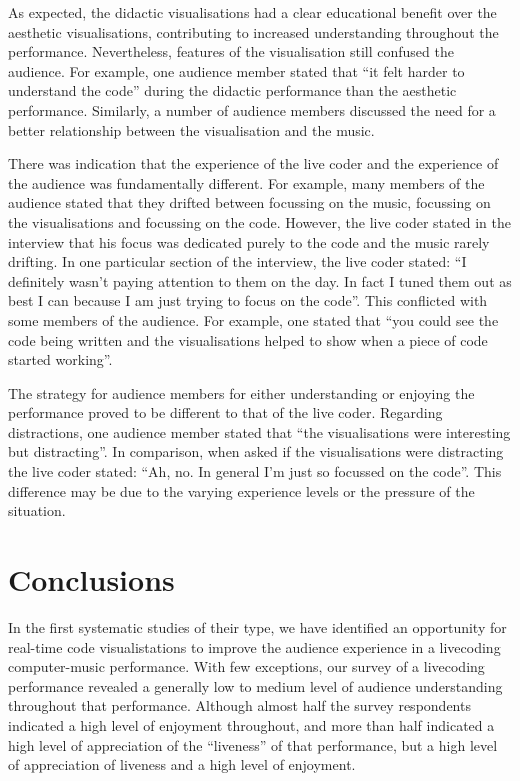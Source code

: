 \documentclass{sig-alternate}
\begin{document}
As expected, the didactic visualisations had a clear educational benefit over the aesthetic visualisations, contributing to increased understanding throughout the performance. Nevertheless, features of the visualisation still confused the audience. For example, one audience member stated that ``it felt harder to understand the code'' during the didactic performance than the aesthetic performance. Similarly, a number of audience members discussed the need for a better relationship between the visualisation and the music.

There was indication that the experience of the live coder and the experience of the audience was fundamentally different. For example, many members of the audience stated that they drifted between focussing on the music, focussing on the visualisations and focussing on the code. However, the live coder stated in the interview that his focus was dedicated purely to the code and the music rarely drifting. In one particular section of the interview, the live coder stated: ``I definitely wasn't paying attention to them on the day. In fact I tuned them out as best I can because I am just trying to focus on the code''. This conflicted with some members of the audience. For example, one stated that ``you could see the code being written and the visualisations helped to show when a piece of code started working''. 

The strategy for audience members for either understanding or enjoying the performance proved to be different to that of the live coder. Regarding distractions, one audience member stated that ``the visualisations were interesting but distracting''. In comparison, when asked if the visualisations were distracting the live coder stated: ``Ah, no. In general I'm just so focussed on the code''. This difference may be due to the varying experience levels or the pressure of the situation.

\section{Conclusions}
In the first systematic studies of their type, we have identified an opportunity for real-time code visualistations to improve the audience experience in a livecoding computer-music performance. With few exceptions, our survey of a livecoding performance revealed a generally low to medium level of audience understanding throughout that performance. Although almost half the survey respondents indicated a high level of enjoyment throughout, and more than half indicated a high level of appreciation of the ``liveness'' of that performance, but a high level of appreciation of liveness and a high level of enjoyment. 
\end{document}
